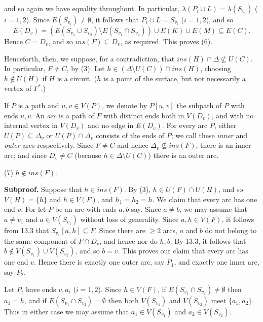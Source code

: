 \noindent and so again we have equality throughout. In particular, $\lambda(P_i \cup L) = \lambda(S_{v_i})$ ($i = 1, 2$). Since $E(S_{v_i}) \ne \emptyset$, it follows that $P_i \cup L = S_{v_i}$ ($i = 1, 2$), and so
\begin{equation*}
E(D_v) = (E(S_{v_1} \cup S_{v_2}) \setminus E(S_{v_1} \cap S_{v_2})) \cup E(K) \cup E(M) \subseteq E(C).
\end{equation*}
Hence $C = D_v$, and so $ins(F) \subseteq D_v$, as required. This proves (6).

Henceforth, then, we suppose, for a contradiction, that $ins(H) \cap \Delta \nsubseteq U(C)$. In particular, $F \ne C$, by (3). Let $h \in (\Delta \setminus U(C)) \cap ins(H)$, choosing $h \notin U(H)$ if $H$ is a circuit. ($h$ is a point of the surface, but not necessarily a vertex of $\Gamma^*$.)

If $P$ is a path and $u, v \in V(P)$, we denote by $P[u, v]$ the subpath of $P$ with ends $u, v$. An \textit{arc} is a path of $F$ with distinct ends both in $V(D_v)$, and with no internal vertex in $V(D_v)$ and no edge in $E(D_v)$. For every arc $P$, either $U(P) \subseteq \Delta_v$ or $U(P) \cap \Delta_v$ consists of the ends of $P$; we call these \textit{inner} and \textit{outer} arcs respectively. Since $F \ne C$ and hence $\Delta_v \nsubseteq ins(F)$, there is an inner arc; and since $D_v \ne C$ (because $h \in \Delta \setminus U(C)$) there is an outer arc.

\hspace*{12pt}(7) $h \notin ins(F)$.

\textbf{Subproof.} Suppose that $h \in ins(F)$. By (3), $h \in U(F) \cap U(H)$, and so $V(H) = \{h\}$ and $h \in V(F)$, and $h_1 = h_2 = h$. We claim that every arc has one end $v$. For let $P$ be an arc with ends $a, b$ say. Since $a \ne b$, we may assume that $a \ne v_1$ and $a \in V(S_{v_1})$ without loss of generality. Since $a, h \in V(F)$, it follows from 13.3 that $S_{v_1}[a, h] \subseteq F$. Since there are $\ge 2$ arcs, $a$ and $b$ do not belong to the same component of $F \cap D_v$, and hence nor do $h, b$. By 13.3, it follows that $b \notin V(S_{v_1}) \cup V(S_{v_2})$, and so $b = v$. This proves our claim that every arc has one end $v$. Hence there is exactly one outer arc, say $P_1$, and exactly one inner arc, say $P_2$.

Let $P_i$ have ends $v, a_i$ ($i = 1, 2$). Since $h \in V(F)$, if $E(S_{v_1} \cap S_{v_2}) \ne \emptyset$ then $a_1 = h$, and if $E(S_{v_1} \cap S_{v_2}) = \emptyset$ then both $V(S_{v_1})$ and $V(S_{v_2})$ meet $\{a_1, a_2\}$. Thus in either case we may assume that $a_1 \in V(S_{v_1})$ and $a_2 \in V(S_{v_2})$.

